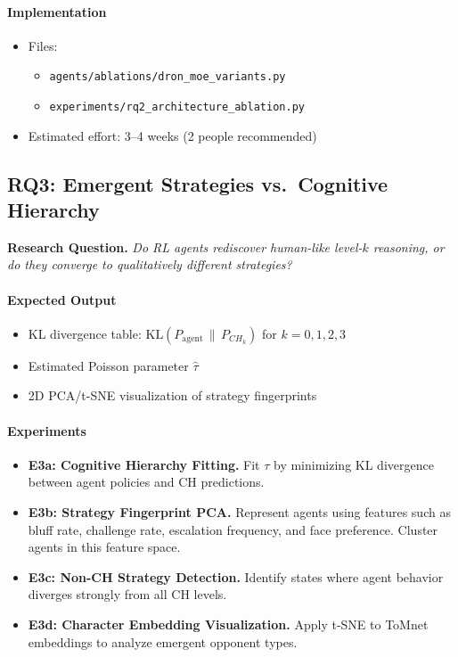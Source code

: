 \documentclass{article}
\begin{document}
\paragraph{Implementation}
\begin{itemize}
    \item Files:
    \begin{itemize}
        \item \texttt{agents/ablations/dron\_moe\_variants.py}
        \item \texttt{experiments/rq2\_architecture\_ablation.py}
    \end{itemize}
    \item Estimated effort: 3--4 weeks (2 people recommended)
\end{itemize}

\subsection{RQ3: Emergent Strategies vs.\ Cognitive Hierarchy}

\textbf{Research Question.}  
\emph{Do RL agents rediscover human-like level-$k$ reasoning, or do they converge to qualitatively different strategies?}

\paragraph{Expected Output}
\begin{itemize}
    \item KL divergence table: $\mathrm{KL}(P_{\text{agent}} \,\|\, P_{CH_k})$ for $k=0,1,2,3$
    \item Estimated Poisson parameter $\hat{\tau}$
    \item 2D PCA/t-SNE visualization of strategy fingerprints
\end{itemize}

\paragraph{Experiments}
\begin{itemize}
    \item \textbf{E3a: Cognitive Hierarchy Fitting.}  
    Fit $\tau$ by minimizing KL divergence between agent policies and CH predictions.

    \item \textbf{E3b: Strategy Fingerprint PCA.}  
    Represent agents using features such as bluff rate, challenge rate, escalation frequency, and face preference.  
    Cluster agents in this feature space.

    \item \textbf{E3c: Non-CH Strategy Detection.}  
    Identify states where agent behavior diverges strongly from all CH levels.

    \item \textbf{E3d: Character Embedding Visualization.}  
    Apply t-SNE to ToMnet embeddings to analyze emergent opponent types.
\end{itemize}
\end{document}
